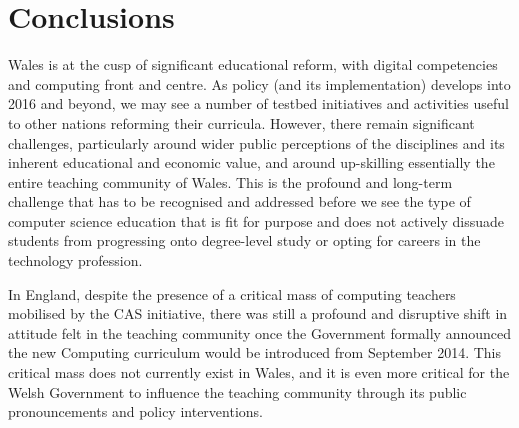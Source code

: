 \documentclass[conference]{IEEEtran}
\begin{document}
\section{Conclusions}\label{conclusions}


Wales is at the cusp of significant educational reform, with digital
competencies and computing front and centre. As policy (and its
implementation) develops into 2016 and beyond, we may see a number of
testbed initiatives and activities useful to other nations reforming
their curricula.
However, there remain significant challenges, particularly
around wider public perceptions of the disciplines and its inherent
educational and economic value, and around up-skilling
essentially the entire teaching community of Wales. This is the
profound and long-term challenge that has to be recognised and
addressed before we see the type of computer science education that is
fit for purpose and does not actively dissuade students from
progressing onto degree-level study or opting for careers in the
technology profession.

In England, despite the presence of a critical mass of computing
teachers mobilised by the CAS initiative, there was still a profound
and disruptive shift in attitude felt in the teaching community once
the Government formally announced the new Computing curriculum would
be introduced from September 2014.  This critical mass does not
currently exist in Wales, and it is even more critical for the Welsh
Government to influence the teaching community through its public
pronouncements and policy interventions.
\end{document}
